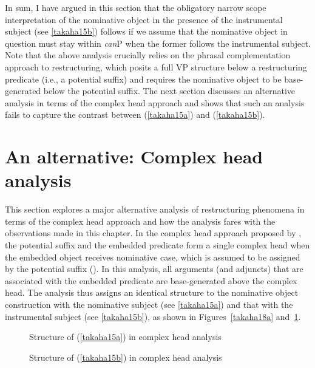 \documentclass[output=paper]{langscibook}
\begin{document}
In sum, I have argued in this section that the obligatory narrow scope interpretation of the nominative object in the presence of the instrumental subject (see \ref{takaha15b}) follows if we assume that the nominative object in question must stay within \emph{can}P when the former follows the instrumental subject. Note that the above analysis crucially relies on the phrasal complementation approach to restructuring, which posits a full VP structure below a restructuring predicate (i.e., a potential suffix) and requires the nominative object to be base-generated below the potential suffix. The next section discusses an alternative analysis in terms of the complex head approach and shows that such an analysis fails to capture the contrast between (\ref{takaha15a}) and (\ref{takaha15b}).

\section{An alternative: Complex head analysis} \label{takahas4}
This section explores a major alternative analysis of restructuring phenomena in terms of the complex head approach and how the analysis fares with the observations made in this chapter.
In the complex head approach proposed by \citet{SaitoHoshi1998}, the potential suffix and the embedded predicate form a single complex head when the embedded object receives nominative case, which is assumed to be assigned by the potential suffix (\citealt{kuno1973}). In this analysis, all arguments (and adjuncts) that are associated with the embedded predicate are base-generated above the complex head. The analysis thus assigns an identical structure to the nominative object construction with the nominative subject (see \ref{takaha15a}) and that with the instrumental subject (see \ref{takaha15b}), as shown in Figures~\ref{takaha18a} and~\ref{takaha18b}.

\begin{figure}
\begin{floatrow}
\captionsetup{margin=.05\linewidth}
		{\caption{\label{takaha18a}Structure of (\ref{takaha15a}) in complex head analysis}}
\ffigbox{\begin{forest}
			[VP[SUBJ\textsubscript{instr}][V'[OBJ\textsubscript{NOM}][V\textsubscript{1can}[V\textsubscript{2}][V\textsubscript{1can}]]]]]
		\end{forest}}
		{\caption{\label{takaha18b}Structure of (\ref{takaha15b}) in complex head analysis}}
\end{floatrow}
\end{figure}
\end{document}
